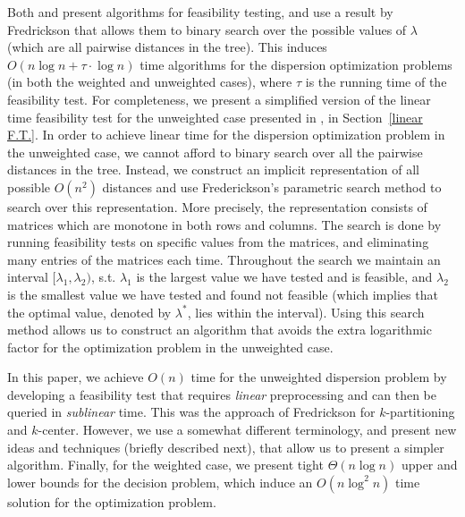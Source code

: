 \documentclass[11pt,a4paper]{article}
\newcommand{\Oh}{{O}}
\theoremstyle{definition}
\theoremstyle{remark}
\begin{document}
Both \cite{Bhattacharya1991} and \cite{Bhattacharya1999} present algorithms for feasibility testing, and use a result by Fredrickson \cite{Frederickson1983} that allows them to binary search over the possible values of $\lambda$ (which are all pairwise distances in the tree). This induces $O(n \log n + \tau \cdot \log n)$ time algorithms for the dispersion optimization problems (in both the weighted and unweighted cases), where $\tau$ is the running time of the feasibility test.
For completeness, we present a simplified version of the linear time feasibility test for the unweighted case presented in \cite{Bhattacharya1991}, in Section~\ref{linear F.T.}.
In order to achieve linear time for the dispersion optimization problem in the unweighted case, we cannot afford to binary search over all the pairwise distances in the tree. Instead, we construct an implicit representation of all possible $O(n^{2})$ distances and use Frederickson's parametric search method to search over this representation. More precisely, the representation consists of matrices which are monotone in both rows and columns. The search is done by running feasibility tests on specific values from the matrices, and eliminating many entries of the matrices each time. Throughout the search we maintain an interval $[\lambda_1,\lambda_2)$, s.t. $\lambda_1$ is the largest value we have tested and is feasible, and $\lambda_2$ is the smallest value we have tested and found not feasible (which implies that the optimal value, denoted by $\lambda^*$, lies within the interval). Using this search method allows us to construct an algorithm that avoids the extra logarithmic factor for the optimization problem in the unweighted case.

In this paper, we achieve $O(n)$ time for the unweighted dispersion problem by developing a feasibility test that requires {\em linear} preprocessing and can then be queried in \emph{sublinear} time. This was the approach of Fredrickson for $k$-partitioning and $k$-center. However, we use a somewhat different terminology, and present new ideas and techniques (briefly described next), that allow us to present a simpler algorithm. Finally, for the weighted case, we present tight $\Theta(n\log n)$ upper and lower bounds for the decision problem, which induce an $\Oh(n\log^2n)$ time solution for the optimization problem. 
\end{document}
